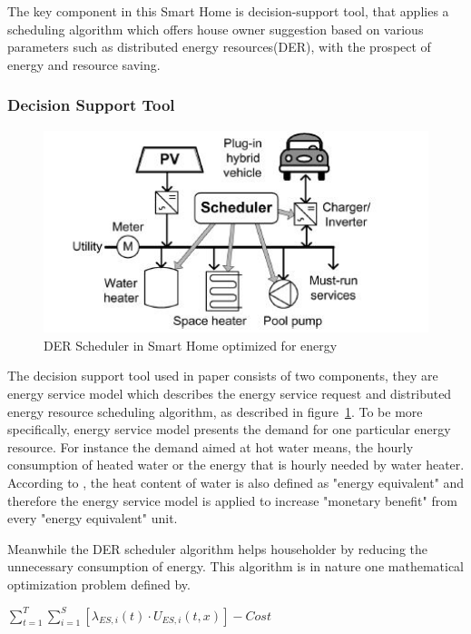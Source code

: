 The key component in this Smart Home is decision-support tool\cite{smart_home_for_energy}, that applies a scheduling algorithm which offers house owner suggestion based on various parameters such as distributed energy resources(DER), with the prospect of energy and resource saving.

\subsubsection{Decision Support Tool}

 \begin{figure}[!htbp]
	\centering
	\includegraphics[width=1.0\textwidth]{scheduler.jpg}
		\caption{DER Scheduler in Smart Home optimized for energy\cite{smart_home_for_energy}}
	\label{fig:smart-home-scheduler}
\end{figure}

The decision support tool used in paper\cite{smart_home_for_energy} consists of two components, they are energy service model which describes the energy service request and distributed energy resource scheduling algorithm, as described in figure~\ref{fig:smart-home-scheduler}. To be more specifically, energy service model presents the demand for one particular energy resource. For instance the demand aimed at hot water means, the hourly consumption of heated water or the energy that is hourly needed by water heater.  According to \cite{smart_home_for_energy}, the heat content of water is also defined as "energy equivalent" and therefore the energy service model is applied to increase "monetary benefit"  from every "energy equivalent" unit.

Meanwhile the DER scheduler algorithm helps householder by reducing the unnecessary consumption of energy. This algorithm is in nature one mathematical optimization problem defined by\cite{smart_home_for_energy}.
\begin{center}
 $ \sum_{t=1}^{T}\sum_{i=1}^{S}[\lambda_{ES,i}(t)\cdot {U_{ES,i}}(t,x)]-Cost$
\end{center}

